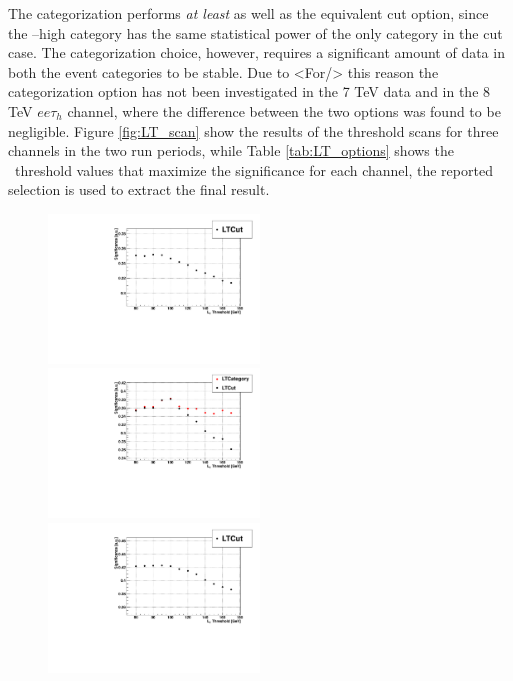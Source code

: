 The categorization performs \emph{at least} as well as the equivalent cut option, since the \LT--high category has the same statistical power of the only category in the cut case. The categorization choice, however, requires a significant amount of data in both the event categories to be stable. Due to <For/> this reason the categorization option has not been investigated in the 7 TeV data and in the 8 TeV $ee\tau_h$ channel, where the difference between the two options was found to be negligible. Figure \ref{fig:LT_scan} show the results of the threshold scans for three channels in the two run periods, while Table \ref{tab:LT_options} shows the \LT\ threshold values that maximize the significance for each channel, the reported selection is used to extract the final result.

\begin{figure}
  \includegraphics[width=0.5\textwidth]{4_Analisys/pics/7TeV/limits/mmt.pdf}
  \includegraphics[width=0.5\textwidth]{4_Analisys/pics/8TeV/limits/mmt.pdf} \\
  \includegraphics[width=0.5\textwidth]{4_Analisys/pics/7TeV/limits/emt.pdf}

\end{figure}
